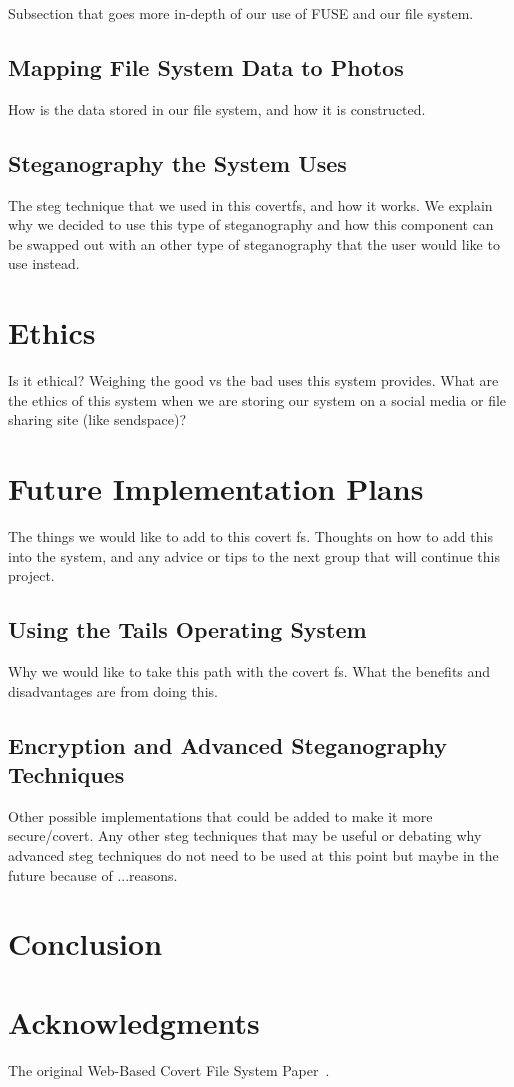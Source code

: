 \documentclass[12pt,journal,compsoc]{IEEEtran}
\begin{document}
Subsection that goes more in-depth of our use of FUSE and our file system.

\subsection{Mapping File System Data to Photos}

How is the data stored in our file system, and how it is constructed.

\subsection{Steganography the System Uses}

The steg technique that we used in this covertfs, and how it works. We explain why we decided to use this type of steganography and how this component can be swapped out with an other type of steganography that the user would like to use instead.

\section{Ethics}

Is it ethical? Weighing the good vs the bad uses this system provides. What are the ethics of this system when we are storing our system on a social media or file sharing site (like sendspace)? 

\section{Future Implementation Plans}

The things we would like to add to this covert fs. Thoughts on how to add this into the system, and any advice or tips to the next group that will continue this project.

\subsection{Using the Tails Operating System}

Why we would like to take this path with the covert fs. What the benefits and disadvantages are from doing this. 

\subsection{Encryption and Advanced Steganography Techniques}

Other possible implementations that could be added to make it more secure/covert. Any other steg techniques that may be useful or debating why advanced steg techniques do not need to be used at this point but maybe in the future because of ...reasons.

\section{Conclusion}

\section{Acknowledgments}

The original Web-Based Covert File System Paper~\cite{Baliga2007}.


\end{document}
